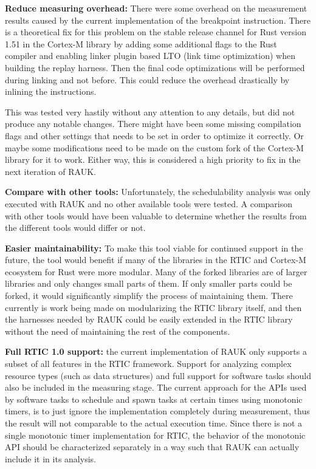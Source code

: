 \textbf{Reduce measuring overhead:} There were some overhead on the measurement
results caused by the current implementation of the breakpoint instruction.
There is a theoretical fix for this problem on the stable release channel for
Rust version 1.51 in the Cortex-M library by adding some additional flags to
the Rust compiler and enabling linker plugin based LTO (link time optimization)
when building the replay harness. Then the final code optimizations will be
performed during linking and not before. This could reduce the overhead
drastically by inlining the instructions. 

This was tested very hastily without any attention to any details, but did not
produce any notable changes. There might have been some missing compilation
flags and other settings that needs to be set in order to optimize it
correctly. Or maybe some modifications need to be made on the custom fork of
the Cortex-M library for it to work. Either way, this is considered a high
priority to fix in the next iteration of RAUK\@.

\textbf{Compare with other tools:} Unfortunately, the schedulability analysis
was only executed with RAUK and no other available tools were tested. A
comparison with other tools would have been valuable to determine whether the
results from the different tools would differ or not. 

\textbf{Easier maintainability:} To make this tool viable for continued support
in the future, the tool would benefit if many of the libraries in the RTIC and
Cortex-M ecosystem for Rust were more modular. Many of the forked libraries
are of larger libraries and only changes small parts of them. If only smaller
parts could be forked, it would significantly simplify the process of
maintaining them. There currently is work being made on modularizing the RTIC
library itself, and then the harnesses needed by RAUK could be easily extended
in the RTIC library without the need of maintaining the rest of the components.

\textbf{Full RTIC 1.0 support:} the current implementation of RAUK only supports
a subset of all features in the RTIC framework. Support for analyzing complex
resource types (such as data structures) and full support for software tasks
should also be included in the measuring stage. The current approach for the APIs
used by software tasks to schedule and spawn tasks at certain times using
monotonic timers, is to just ignore the implementation completely during
measurement, thus the result will not comparable to the actual execution time.
Since there is not a single monotonic timer implementation for RTIC, the
behavior of the monotonic API should be characterized separately in a way such
that RAUK can actually include it in its analysis.

